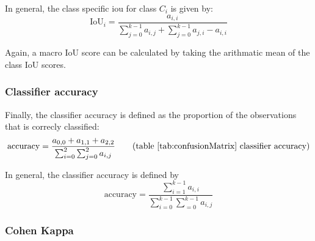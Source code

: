 In general, the class specific \acrfull{iou} for class $C_i$ is given by:
\begin{equation}
    \text{IoU}_i = \frac{a_{i,i}}{\sum_{j=0}^{k-1} a_{i, j} + \sum_{j=0}^{k-1} a_{j,i} - a_{i,i}} 
\end{equation}

Again, a macro IoU score can be calculated by taking the arithmatic mean of the class IoU scores.

\subsubsection{Classifier accuracy}

Finally, the classifier accuracy is defined as the proportion of the observations that is correcly classified:
\begin{equation}
    \text{accuracy} = \frac{a_{0,0} + a_{1,1} + a_{2,2}}{\sum_{i=0}^{2} \sum_{j=0}^{2} a_{i,j}   } \tag{table \ref{tab:confusionMatrix} classifier accuracy}
\end{equation}

In general, the classifier accuracy is defined by 
\begin{equation}
    \text{accuracy} = \frac{\sum_{i=1}^{k-1}a_{i,i}}{\sum_{i=0}^{k-1} \sum_{=0}^{k-1} a_{i,j}   } 
\end{equation}

\subsubsection{Cohen Kappa}

